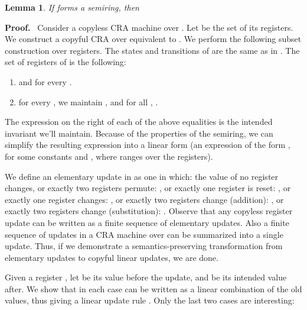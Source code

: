 \documentclass[11pt]{article}
\newtheorem{lemma}[theorem]{Lemma}
\def\Proof{{\bf Proof.}}
\begin{document}
\begin{lemma}\label{lemma:reg-to-cra}
If  forms a semiring, then

\end{lemma}
\Proof~
Consider a copyless CRA machine  over .
Let  be the set of its registers. We construct a copyful CRA 
over  equivalent to .
We perform the following subset construction over registers. The states
and transitions of  are the same as in .
The set of registers  of  is the following:
\begin{enumerate}
\item  and  for every .
\item for every , we maintain ,
and for all , .
\end{enumerate}
The expression on the right of each of the above equalities is the
intended invariant we'll maintain. Because of the properties of the
semiring, we can simplify the resulting expression into a linear form (an expression of the form , for some constants  and , where  ranges over the registers).

We define an elementary update in  as one in which:
the value of no register changes, or
exactly two registers permute: , or
exactly one register is reset: , or
exactly one register changes: , or
exactly two registers change (addition): , or
exactly two registers change (substitution): .
Observe that any copyless register update can be written as a finite
sequence of elementary updates. Also a finite sequence of updates
in a CRA machine over  can be summarized into a single update. Thus,
if we demonstrate a semantics-preserving transformation from elementary
updates to copyful linear updates, we are done.

Given a register , let  be its value before the update,
and  be its intended value after. We show that 
in each case can be written as a linear combination of the old values,
thus giving a linear update rule . Only the last two cases are interesting:
\end{document}
